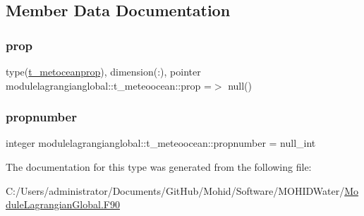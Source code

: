\subsection{Member Data Documentation}
\mbox{\label{structmodulelagrangianglobal_1_1t__meteoocean_aebad27f921a39e06e014e6b51364190b}} 
\subsubsection{\texorpdfstring{prop}{prop}}
{\footnotesize\ttfamily type(\mbox{\hyperlink{structmodulelagrangianglobal_1_1t__metoceanprop}{t\+\_\+metoceanprop}}), dimension(\+:), pointer modulelagrangianglobal\+::t\+\_\+meteoocean\+::prop =$>$ null()\hspace{0.3cm}{\ttfamily [private]}}

\mbox{\label{structmodulelagrangianglobal_1_1t__meteoocean_a7bd2eb359fd6acd379ed4128a0f1ba01}} 
\subsubsection{\texorpdfstring{propnumber}{propnumber}}
{\footnotesize\ttfamily integer modulelagrangianglobal\+::t\+\_\+meteoocean\+::propnumber = null\+\_\+int\hspace{0.3cm}{\ttfamily [private]}}



The documentation for this type was generated from the following file\+:\begin{DoxyCompactItemize}
\item 
C\+:/\+Users/administrator/\+Documents/\+Git\+Hub/\+Mohid/\+Software/\+M\+O\+H\+I\+D\+Water/\mbox{\hyperlink{_module_lagrangian_global_8_f90}{Module\+Lagrangian\+Global.\+F90}}\end{DoxyCompactItemize}

